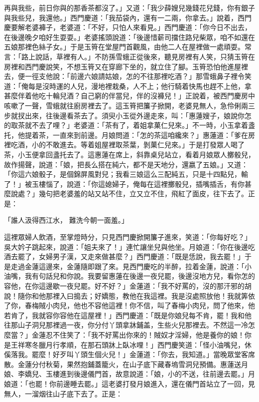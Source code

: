再與我些，前日你與的那香茶都沒了。」又道：「我少薛嫂兒幾錢花兒錢，你有銀子與我些兒，我還他。」西門慶道：「我茄袋內，還有一二兩，你拿去。」說着，西門慶要解老婆褲子，老婆道：「不好，只怕人來看見。」西門慶道：「你今日不出去，在後邊晚夕咱好生耍耍。」老婆搖頭說道：「後邊惜薪司擋住路兒柴眾，咱不如還在五娘那裡色絲子女。」于是玉筲在堂屋門首觀風，由他二人在屋裡做一處頑耍。常言：「路上說話，草裡有人。」不防孫雪蛾正從後來，聽見房裡有人笑，只猜玉筲在房裡和西門慶說笑，不想玉筲又在穿廊下坐的，就立住了腳。玉筲恐怕他進屋裡去，便一徑支他說：「前邊六娘請姑娘，怎的不往那裡吃酒？」那雪蛾鼻子裡令笑道：「俺每是沒時運的人兒，漫地裡栽桑，人不上；他行騎着快馬也趕不上他，拿甚麼伴着他吃十輪兒酒？自己窮的伴當兒，伴的沒褲兒！」正說着，被西門慶房中咳嗽了一聲，雪蛾就往廚房裡去了。這玉筲把簾子掀開，老婆見無人，急伶俐兩三步就扠出來，往後邊看茶去了。須臾小玉從外邊走來，叫：「惠蓮嫂子，娘說你怎的取茶就不去了哩？」老婆道：「茶有了，着姐拿菓仁兒來。」不一時，小玉拿着盞托，他提着茶，一直來到前邊。月娘問道：「怎的茶這咱纔來？」惠蓮道：「爹在房裡吃酒，小的不敢進去。等着姐屋裡取茶葉，剝菓仁兒來。」于是打發眾人喝了茶，小玉便拿回盞托去了。這惠蓮在席上，斜靠桌兒站立，看着月娘眾人擲骰兒，故作揚聲，說道：「娘，把長么搭在純六，都不是天地分，還嬴了五娘。」又道：「你這六娘骰子，是個錦屏風對兒；我看三娘這么三配純五，只是十四點兒，輸了！」被玉樓惱了，說道：「你這媳婦子，俺每在這裡擲骰兒，插嘴插舌，有你甚麼說處？」幾句把老婆羞的站又站不住，立又立不住，飛紅了面皮，往下去了。正是：

「誰人汲得西江水，  難洗今朝一面羞。」

這裡眾婦人飲酒，至掌燈時分，只見西門慶掀開簾子進來，笑道：「你每好吃？」吳大妗子跳起來，說道：「姐夫來了！」連忙讓坐兒與他坐。月娘道：「你在後邊吃酒去罷了，女婦男子漢，又走來做甚麼？」西門慶道：「既是恁說，我去罷！」于是走過金蓮這邊來，金蓮隨即跟了來。見西門慶吃的半醉，拉着金蓮，說道：「小油嘴，我有句話兒和你說。我要留惠蓮在後邊一夜兒罷，後邊沒地方兒，看你怎的容他，在你這邊歇一夜兒罷。好不好？」金蓮道：「我不好罵的，沒的那汗邪的胡說！隨你和他那裡入曰搗去；好嬌態，教他在我這裡。我是沒處照放他！我就筭依了你，春梅賊小肉兒，他也不容他這裡！你不信，叫了春梅小肉兒，問了他來，他若肯了，我就容你容他在這屋裡！」西門慶道：「既是你娘兒每不肯，罷！我和他往那山子洞兒那裡過一夜，你分付丫頭拿牀鋪盖，生些火兒那裡去。不然這一冷怎麼當？」金蓮忍不住笑了：「我不好罵出你來的！賊奴才淫婦，他是養你的娘！你是王祥寒冬臘月行孝順，在那石頭牀上臥冰哩！」西門慶笑道：「怪小油嘴兒，休傒落我。罷麼！好歹叫丫頭生個火兒！」金蓮道：「你去，我知道。」當晚眾堂客席散。金蓮分付秋菊，果然抱鋪蓋籠火，在山子底下藏春塢雪洞兒預備。惠蓮送月娘、李嬌兒、玉樓進到後邊儀門首，故意說道：「娘，小的不送，往前邊去罷。」月娘道：「也罷！你前邊睡去罷。」這老婆打發月娘進入，還在儀門首站立了一回，見無人，一溜烟往山子底下去了。正是：

